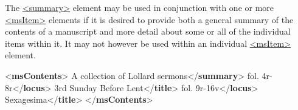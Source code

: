 The \hyperref[TEI.summary]{<summary>} element may be used in conjunction with one or more \hyperref[TEI.msItem]{<msItem>} elements if it is desired to provide both a general summary of the contents of a manuscript and more detail about some or all of the individual items within it. It may not however be used within an individual \hyperref[TEI.msItem]{<msItem>} element.\par\bgroup{}\exampleFont \begin{shaded}\noindent\mbox{}{<\textbf{msContents}>}\mbox{}\newline 
{}A collection of Lollard sermons{</\textbf{summary}>}\mbox{}\newline 
{}\mbox{}\newline 
\hspace*{1em}fol. 4r-8r{</\textbf{locus}>}\mbox{}\newline 
\hspace*{1em}3rd Sunday Before Lent{</\textbf{title}>}\mbox{}\newline 
{}\mbox{}\newline 
{}\mbox{}\newline 
\hspace*{1em}fol. 9r-16v{</\textbf{locus}>}\mbox{}\newline 
\hspace*{1em}Sexagesima{</\textbf{title}>}\mbox{}\newline 
{}\mbox{}\newline 
{</\textbf{msContents}>}\end{shaded}\egroup\par 
